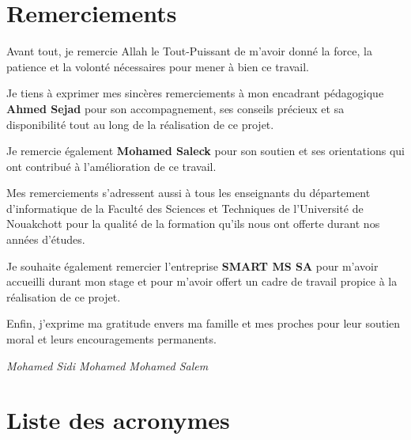 ﻿\documentclass[12pt,a4paper]{report}
\begin{document}

\chapter*{Remerciements}
Avant tout, je remercie Allah le Tout-Puissant de m'avoir donné la force, la patience et la volonté nécessaires pour mener à bien ce travail.

Je tiens à exprimer mes sincères remerciements à mon encadrant pédagogique \textbf{Ahmed Sejad} pour son accompagnement, ses conseils précieux et sa disponibilité tout au long de la réalisation de ce projet.

Je remercie également \textbf{Mohamed Saleck} pour son soutien et ses orientations qui ont contribué à l'amélioration de ce travail.

Mes remerciements s'adressent aussi à tous les enseignants du département d'informatique de la Faculté des Sciences et Techniques de l'Université de Nouakchott pour la qualité de la formation qu'ils nous ont offerte durant nos années d'études.

Je souhaite également remercier l'entreprise \textbf{SMART MS SA} pour m'avoir accueilli durant mon stage et pour m'avoir offert un cadre de travail propice à la réalisation de ce projet.

Enfin, j'exprime ma gratitude envers ma famille et mes proches pour leur soutien moral et leurs encouragements permanents.

\begin{flushright}
\textit{Mohamed Sidi Mohamed Mohamed Salem}
\end{flushright}

\cleardoublepage
{}
{}
\thispagestyle{plain}




\tableofcontents
{}

\listoffigures
{}

\listoftables
{}

\chapter*{Liste des acronymes}
\end{document}
